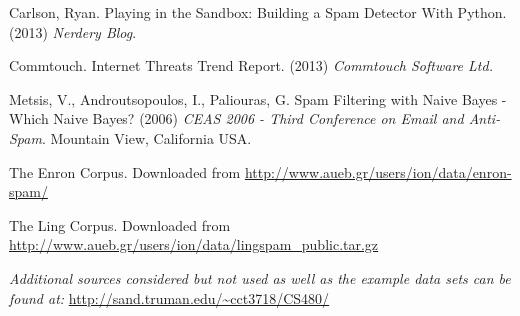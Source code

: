 \documentclass[12pt]{article}
\begin{document}
\begin{flushleft}
Carlson, Ryan.  Playing in the Sandbox: Building a Spam Detector With Python.  (2013)  \textit{Nerdery Blog}.
\end{flushleft}

\begin{flushleft}
Commtouch.  Internet Threats Trend Report. (2013) \textit{Commtouch Software Ltd.}
\end{flushleft}

\begin{flushleft}
Metsis, V., Androutsopoulos, I., Paliouras, G.  Spam Filtering with Naive Bayes - Which Naive Bayes?
(2006)  \textit{CEAS 2006 - Third Conference on Email and Anti-Spam}. Mountain View, California USA.
\end{flushleft}

\begin{flushleft}
The Enron Corpus.  Downloaded from \url{http://www.aueb.gr/users/ion/data/enron-spam/}
\end{flushleft}

\begin{flushleft}
The Ling Corpus.  Downloaded from \url{http://www.aueb.gr/users/ion/data/lingspam_public.tar.gz}
\end{flushleft}

\begin{flushleft}
\textit{Additional sources considered but not used as well as the example data sets can be found at: }
\url{http://sand.truman.edu/~cct3718/CS480/}
\end{flushleft}
\end{document}
